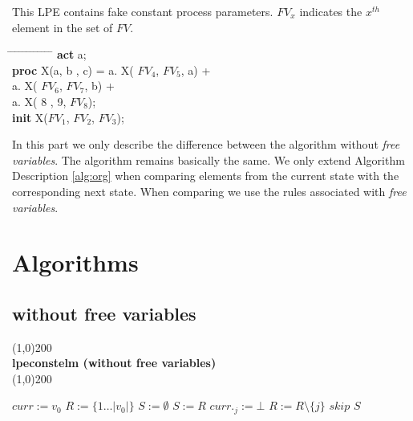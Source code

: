 \index{}\documentclass[a4paper,10pt]{article}
\theoremstyle{plain}
\theoremstyle{definition}
\newcommand{\pps}{process parameters}
\newcommand{\ti}{\textit}
\newcommand{\tb}{\textbf}
\newcommand{\tabw}{\hspace*{15.mm} \= \hspace*{20.mm} \= \hspace*{5.mm} \= \hspace*{5.mm} \= \hspace*{5.mm} \= \hspace*{5.mm}  \= \hspace*{5.mm}  \= \hspace*{5.mm}  \= \hspace*{5.mm} \= \hspace*{5.mm} \= \hspace*{5.mm}  \= \hspace*{5.mm}  \= \hspace*{5.mm}\kill}
\begin{document}
\begin{example}\label{freevarcheckup} This LPE contains fake constant \pps .  $FV_x$ indicates the $x^{th}$ element in the set of $FV$. 
\begin{tabbing}
\tabw
\tb{act} \> a; \\
\tb{proc} \> X(a, b , c) =     \>  a. X( $FV_4$, $FV_5$, a) + \\
\>                             \>  a. X( $FV_6$, $FV_7$, b) + \\
\>                             \>  a. X(   8 ,   9,  $FV_8$);  \\
\tb{init} \> X($FV_1$, $FV_2$, $FV_3$);
\end{tabbing}
\end{example}


In this part we only describe the difference between the algorithm without \ti{free variables}. The algorithm remains basically the same. We only extend Algorithm Description \ref{alg:org} when comparing elements from the current state with the corresponding next state. When comparing we use the rules associated with \ti{free variables}.

\newpage
\section{Algorithms}
\subsection{without free variables} \label{sec:alg}
\line(1,0){200}\\
\textbf{lpeconstelm (without free variables)}\\
\line(1,0){200}
\begin{algorithmic}[1]
\STATE $curr := v_0$
\STATE $R := \lbrace 1 \ldots \vert v_0 \vert \rbrace $
\STATE $S := \emptyset $
    \STATE $S := R$
              \STATE $curr._j := \bot$
              \STATE $R := R \setminus \lbrace j \rbrace$
              \STATE $skip$
          \ENDIF 
        \ENDFOR
    \ENDFOR 
  \ENDWHILE
\RETURN $S$
\end{algorithmic}

\newpage
\end{document}
